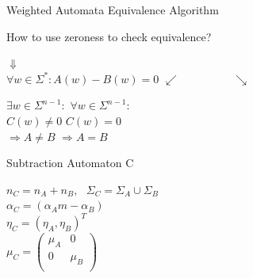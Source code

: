 \documentclass[rgb, pdf]{beamer}
\begin{document}
\begin{frame}{Weighted Automata Equivalence Algorithm~\autocite{Kiefer2013OnTC}}
\begin{minipage}[b][.5\textheight][t]{.25\textwidth}
\begin{center}
    \end{center}
    \end{minipage}\hfill
    \begin{minipage}[b][.5\textheight][t]{.32\textwidth}
    \vspace{0.3cm}
    \begin{small}
     How to use zeroness to check equivalence?
    \end{small}
    \begin{center}\vspace{-0.3cm}
     $\Downarrow$ \\
     $\forall w \in \Sigma^*: A(w) - B(w) = 0$
     $\swarrow \hspace{2cm} \searrow$
    \end{center}
    $\exists w \in \Sigma^{n-1}:$ \hfill $\forall w \in \Sigma^{n-1}:$\\
    $C(w) \neq 0$ \hfill $C(w) = 0$\\
    $\Rightarrow A \neq B$ \hfill $\Rightarrow A = B$
    \end{minipage}\hfill
    \begin{minipage}[b][.5\textheight][t]{.32\textwidth}
    Subtraction Automaton C
    \begin{center}
     $n_C = n_A + n_B, \text{  } \Sigma_C = \Sigma_A \cup \Sigma_B$ \\ \vspace{0.3cm}
     $\alpha_C = (\alpha_Am - \alpha_B)$\\ \vspace{0.3cm}
     $ \eta_C = (\eta_A, \eta_B)^T$ \\ \vspace{0.3cm}
     $\mu_C = \begin{pmatrix}
                                    \mu_A & 0 \\
                                    0 & \mu_B \\
                                \end{pmatrix}$
    \end{center}

    
    
    \end{minipage}%

    \end{frame}
\end{document}
